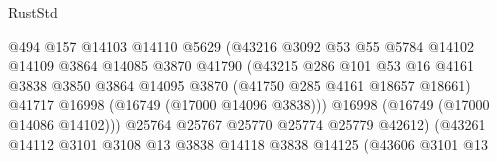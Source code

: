 \begin{lexlean}{RustStd}
\begin{coremodule}
                                          @494
                                          @157
                                          @14103
                                          @14110
                                          @5629
                                          (@43216
                                            @3092
                                            @53
                                            @55
                                            @5784
                                            @14102
                                            @14109
                                            @3864
                                            @14085
                                            @3870
                                            @41790
                                            (@43215
                                              @286
                                              @101
                                              @53
                                              @16
                                              @4161
                                              @3838
                                              @3850
                                              @3864
                                              @14095
                                              @3870
                                              (@41750 @285 @4161 @18657 @18661)
                                              @41717
                                              @16998
                                              (@16749 (@17000 @14096 @3838)))
                                            @16998
                                            (@16749 (@17000 @14086 @14102)))
                                          @25764
                                          @25767
                                          @25770
                                          @25774
                                          @25779
                                          @42612)
                                        (@43261
                                          @14112
                                          @3101
                                          @3108
                                          @13
                                          @3838
                                          @14118
                                          @3838
                                          @14125
                                          (@43606
                                            @3101
                                            @13

\end{coremodule}
\end{lexlean}
